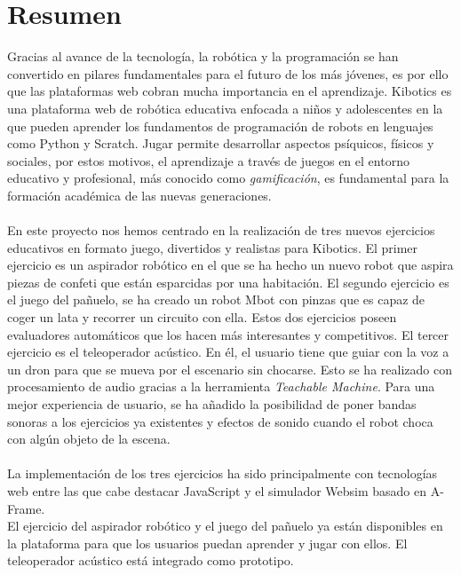 \newpage
\thispagestyle{plain}			%
\setlength{\parskip}{0pt plus 1.0pt}
\section*{Resumen}
Gracias al avance de la tecnología, la robótica y la programación se han convertido en pilares fundamentales para el futuro de los más jóvenes, es por ello que las plataformas web cobran mucha importancia en el aprendizaje. Kibotics es una plataforma web de robótica educativa enfocada a niños y adolescentes en la que pueden aprender los fundamentos de programación de robots en lenguajes como Python y Scratch. Jugar permite desarrollar aspectos psíquicos, físicos y sociales, por estos motivos, el aprendizaje a través de juegos en el entorno educativo y profesional, más conocido como \textit{gamificación}, es fundamental para la formación académica de las nuevas generaciones.
\\
 \\
En este proyecto nos hemos centrado en la realización de tres nuevos ejercicios educativos en formato juego, divertidos y realistas para Kibotics. El primer ejercicio  es un aspirador robótico en el que se ha hecho un nuevo robot que aspira piezas de confeti que están esparcidas por una habitación. El segundo  ejercicio  es el juego del pañuelo, se ha creado un robot Mbot con pinzas que es capaz de coger un lata y recorrer un circuito con ella. 
Estos dos ejercicios poseen evaluadores automáticos que los hacen más interesantes y competitivos. El tercer ejercicio es el teleoperador acústico. En él,  el usuario tiene que guiar con la voz a un dron para que se mueva por el escenario sin chocarse. Esto se ha realizado con procesamiento de audio gracias a la herramienta \textit{Teachable Machine}.
Para una mejor experiencia de usuario, se ha  añadido la posibilidad de poner bandas sonoras a los ejercicios ya existentes y efectos de sonido cuando el robot choca con algún objeto de la escena.
\\
\\
La implementación de los tres ejercicios ha sido principalmente con tecnologías web entre las que cabe destacar JavaScript y el simulador Websim basado en A-Frame.
\\
El ejercicio del aspirador robótico y el juego del pañuelo ya están disponibles en la plataforma para que los usuarios puedan aprender y jugar con ellos. El teleoperador acústico está integrado como prototipo.

